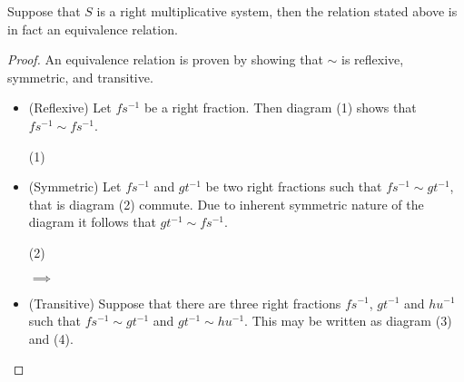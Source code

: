     \begin{prop}
        Suppose that $S$ is a right multiplicative system, then the relation stated above is in fact an equivalence relation.
    \end{prop}

    \begin{proof}
        An equivalence relation is proven by showing that $\sim$ is reflexive, symmetric, and transitive.
        \begin{itemize}
            \item (Reflexive) Let $fs^{-1}$ be a right fraction. Then diagram (1) shows that $fs^{-1}\sim fs^{-1}$.
            \begin{center} (1)
            \end{center}
            \item (Symmetric) Let $fs^{-1}$ and $gt^{-1}$ be two right fractions such that $fs^{-1}\sim gt^{-1}$, that is diagram (2) commute. Due to inherent symmetric nature of the diagram it follows that $gt^{-1}\sim fs^{-1}$.
            \begin{center} (2)
                $\implies$
            \end{center}
            \item (Transitive) Suppose that there are three right fractions $fs^{-1}$, $gt^{-1}$ and $hu^{-1}$ such that $fs^{-1}\sim gt^{-1}$ and $gt^{-1}\sim hu^{-1}$. This may be written as diagram (3) and (4).

\end{itemize}
\end{proof}
